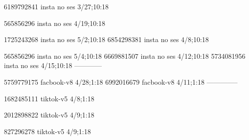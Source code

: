 
6189792841 insta no ses
3/27;10:18

565856296 insta no ses
4/19;10:18

1725243268 insta no ses
5/2;10:18
6854298381 insta no ses
4/8;10:18

565856296 insta no ses
5/4;10:18
6669881507 insta no ses
4/12;10:18
5734081956 insta no ses
4/15;10:18
------------


5759779175 facbook-v8
4/28;1:18
6992016679 facbook-v8
4/11;1:18
--------------



1682485111 tiktok-v5
4/8;1:18

2012898822 tiktok-v5
4/9;1:18

827296278 tiktok-v5
4/9;1:18
